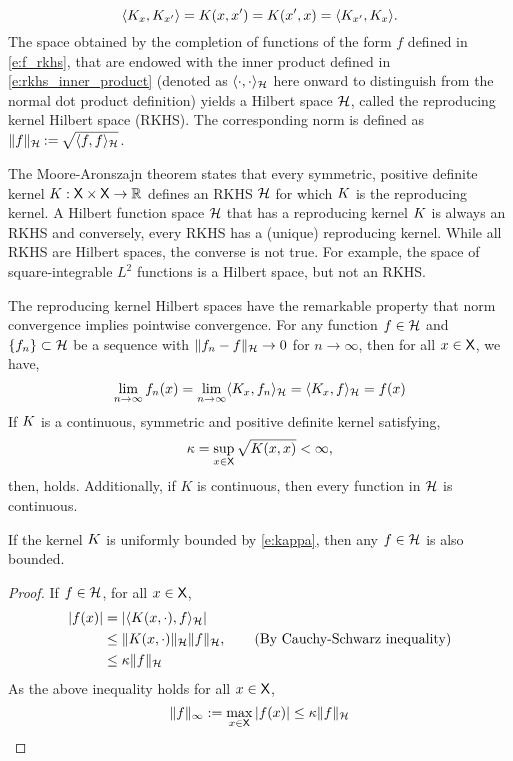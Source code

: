 \begin{equation}
\langle K_x, K_{x'} \rangle =  K(x,x') = K(x',x) =  \langle K_{x'}, K_x \rangle. 
\end{equation}
The space obtained by the completion of functions of the form $f$ defined in \eqref{e:f_rkhs}, that are endowed with the inner product defined in \eqref{e:rkhs_inner_product} (denoted as $\langle \cdot, \cdot \rangle_{{\cal H}}$ here onward to distinguish from the normal dot product definition) yields a Hilbert space ${\cal H}$, called the reproducing kernel Hilbert space (RKHS). The corresponding norm is defined as $\|f\|_{\cal H} \mathbin{:=} \sqrt{\langle f, f \rangle_{\cal H}}$. 

The Moore-Aronszajn theorem states that every symmetric, positive definite kernel $K : {\sf X} \times {\sf X} \to \mathbb{R}$ defines an RKHS ${\cal H}$ for which $K$ is the reproducing kernel. A Hilbert function space ${\cal H}$ that has a reproducing kernel $K$ is always an RKHS and conversely, every RKHS has a (unique) reproducing kernel. While all RKHS are Hilbert spaces, the converse is not true. For example, the space of square-integrable $L^2$ functions is a Hilbert space, but not an RKHS. 

The reproducing kernel Hilbert spaces have the remarkable property that norm convergence implies pointwise convergence. 
For any function $f\in{\cal H}$ and $\{f_n\}\subset {\cal H}$ be a sequence with $\|f_n - f\|_{\cal H} \to 0$ for $n \to \infty$, then for all $x \in {\sf X}$, we have,
\begin{equation}
\lim_{n\to\infty} f_n(x) = \lim_{n \to \infty} \langle K_x,  f_n \rangle_{\cal H} = \langle K_x, f \rangle_{\cal H} = f(x)
\end{equation}
If $K$ is a continuous, symmetric and positive definite kernel satisfying, 
\begin{equation}
\kappa = \sup_{x \in \state} \sqrt{\Kern(x,x)} < \infty,
\label{e:kappa}
\end{equation}
then,  holds. Additionally, if $K$ is continuous, then every function in ${\cal H}$ is continuous. 
\begin{proposition}
\label{prop:RKHS_bounded}
	If the kernel $K$ is uniformly bounded by \eqref{e:kappa}, then any $f \in {\cal H}$ is also bounded. 
\end{proposition}
\begin{proof}
	If $f \in {\cal H}$, for all $x \in {\sf X}$,
	\begin{equation}
	\begin{aligned}
	|f(x)| &= |\langle K(x,\cdot), f \rangle_{\cal H}| \\
	& \leq \|K(x,\cdot)\|_{\cal H} \|f\|_{\cal H}, \qquad{\text{(By Cauchy-Schwarz inequality)}}\\ 
	& \leq \kappa \|f\|_{\cal H}
	\end{aligned}
	\end{equation}
	As the above inequality holds for all $x \in {\sf X}$, 
	\begin{equation}
	\|f\|_\infty := \max_{x\in {\sf X}}|f(x)| \leq \kappa \|f\|_{\cal H}
	\end{equation}
\end{proof}


